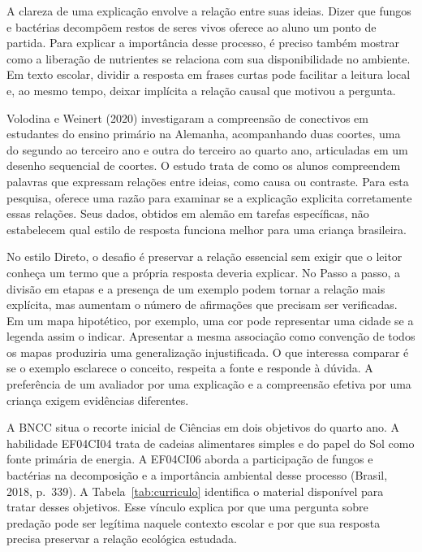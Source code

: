 A clareza de uma explicação envolve a relação entre suas ideias. Dizer que fungos e bactérias decompõem restos de seres vivos oferece ao aluno um ponto de partida. Para explicar a importância desse processo, é preciso também mostrar como a liberação de nutrientes se relaciona com sua disponibilidade no ambiente. Em texto escolar, dividir a resposta em frases curtas pode facilitar a leitura local e, ao mesmo tempo, deixar implícita a relação causal que motivou a pergunta.

Volodina e Weinert (2020) investigaram a compreensão de conectivos em estudantes do ensino primário na Alemanha, acompanhando duas coortes, uma do segundo ao terceiro ano e outra do terceiro ao quarto ano, articuladas em um desenho sequencial de coortes. O estudo trata de como os alunos compreendem palavras que expressam relações entre ideias, como causa ou contraste. Para esta pesquisa, oferece uma razão para examinar se a explicação explicita corretamente essas relações. Seus dados, obtidos em alemão em tarefas específicas, não estabelecem qual estilo de resposta funciona melhor para uma criança brasileira.

No estilo Direto, o desafio é preservar a relação essencial sem exigir que o leitor conheça um termo que a própria resposta deveria explicar. No Passo a passo, a divisão em etapas e a presença de um exemplo podem tornar a relação mais explícita, mas aumentam o número de afirmações que precisam ser verificadas. Em um mapa hipotético, por exemplo, uma cor pode representar uma cidade se a legenda assim o indicar. Apresentar a mesma associação como convenção de todos os mapas produziria uma generalização injustificada. O que interessa comparar é se o exemplo esclarece o conceito, respeita a fonte e responde à dúvida. A preferência de um avaliador por uma explicação e a compreensão efetiva por uma criança exigem evidências diferentes.

A BNCC situa o recorte inicial de Ciências em dois objetivos do quarto ano. A habilidade EF04CI04 trata de cadeias alimentares simples e do papel do Sol como fonte primária de energia. A EF04CI06 aborda a participação de fungos e bactérias na decomposição e a importância ambiental desse processo (Brasil, 2018, p.~339). A Tabela~\ref{tab:curriculo} identifica o material disponível para tratar desses objetivos. Esse vínculo explica por que uma pergunta sobre predação pode ser legítima naquele contexto escolar e por que sua resposta precisa preservar a relação ecológica estudada.

